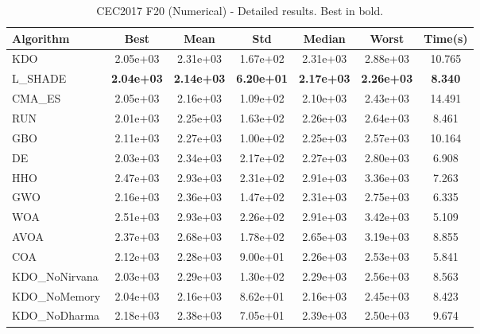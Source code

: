 \begin{table}[H]
\centering\small
\caption{CEC2017 F20 (Numerical) - Detailed results. Best in bold.}
\label{tab:cec2017_F20}
\begin{tabular}{lcccccc}
\toprule
\textbf{Algorithm} & \textbf{Best} & \textbf{Mean} & \textbf{Std} & \textbf{Median} & \textbf{Worst} & \textbf{Time(s)} \\
\midrule
KDO & 2.05e+03 & 2.31e+03 & 1.67e+02 & 2.31e+03 & 2.88e+03 & 10.765 \\
L_SHADE & \textbf{2.04e+03} & \textbf{2.14e+03} & \textbf{6.20e+01} & \textbf{2.17e+03} & \textbf{2.26e+03} & \textbf{8.340} \\
CMA_ES & 2.05e+03 & 2.16e+03 & 1.09e+02 & 2.10e+03 & 2.43e+03 & 14.491 \\
RUN & 2.01e+03 & 2.25e+03 & 1.63e+02 & 2.26e+03 & 2.64e+03 & 8.461 \\
GBO & 2.11e+03 & 2.27e+03 & 1.00e+02 & 2.25e+03 & 2.57e+03 & 10.164 \\
DE & 2.03e+03 & 2.34e+03 & 2.17e+02 & 2.27e+03 & 2.80e+03 & 6.908 \\
HHO & 2.47e+03 & 2.93e+03 & 2.31e+02 & 2.91e+03 & 3.36e+03 & 7.263 \\
GWO & 2.16e+03 & 2.36e+03 & 1.47e+02 & 2.31e+03 & 2.75e+03 & 6.335 \\
WOA & 2.51e+03 & 2.93e+03 & 2.26e+02 & 2.91e+03 & 3.42e+03 & 5.109 \\
AVOA & 2.37e+03 & 2.68e+03 & 1.78e+02 & 2.65e+03 & 3.19e+03 & 8.855 \\
COA & 2.12e+03 & 2.28e+03 & 9.00e+01 & 2.26e+03 & 2.53e+03 & 5.841 \\
KDO_NoNirvana & 2.03e+03 & 2.29e+03 & 1.30e+02 & 2.29e+03 & 2.56e+03 & 8.563 \\
KDO_NoMemory & 2.04e+03 & 2.16e+03 & 8.62e+01 & 2.16e+03 & 2.45e+03 & 8.423 \\
KDO_NoDharma & 2.18e+03 & 2.38e+03 & 7.05e+01 & 2.39e+03 & 2.50e+03 & 9.674 \\
\bottomrule
\end{tabular}
\end{table}
